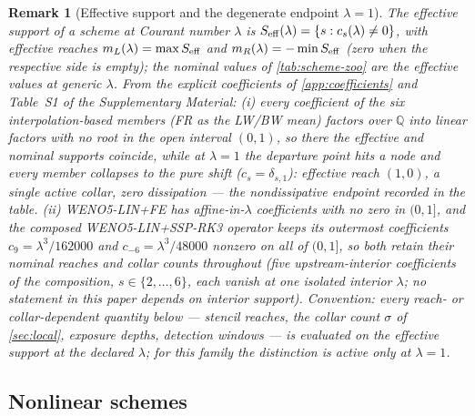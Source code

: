\documentclass[pdflatex,sn-mathphys-num]{sn-jnl}%
\theoremstyle{thmstyleone}%
\theoremstyle{thmstyletwo}%
\newtheorem{remark}{Remark}%
\theoremstyle{thmstylethree}%
\begin{document}
\begin{remark}[Effective support and the degenerate endpoint $\lambda=1$]\label{rem:effective-support}
The \emph{effective support} of a scheme at Courant number $\lambda$ is $S_{\rm eff}(\lambda)=\{s: c_s(\lambda)\ne0\}$, with effective reaches $m_L(\lambda)=\max S_{\rm eff}$ and $m_R(\lambda)=-\min S_{\rm eff}$ (zero when the respective side is empty); the nominal values of \cref{tab:scheme-zoo} are the effective values at generic $\lambda$.
From the explicit coefficients of \cref{app:coefficients} and Table~S1 of the Supplementary Material:
(i) every coefficient of the six interpolation-based members (FR as the LW/BW mean) factors over $\mathbb Q$ into linear factors with no root in the open interval $(0,1)$, so there the effective and nominal supports coincide, while at $\lambda=1$ the departure point hits a node and every member collapses to the pure shift ($c_s=\delta_{s,1}$): effective reach $(1,0)$, a single active collar, zero dissipation --- the nondissipative endpoint recorded in the table.
(ii) WENO5-LIN+FE has affine-in-$\lambda$ coefficients with no zero in $(0,1]$, and the composed WENO5-LIN+SSP-RK3 operator keeps its outermost coefficients $c_9=\lambda^{3}/162000$ and $c_{-6}=\lambda^{3}/48000$ nonzero on all of $(0,1]$, so both retain their nominal reaches and collar counts throughout (five upstream-interior coefficients of the composition, $s\in\{2,\dots,6\}$, each vanish at one isolated interior $\lambda$; no statement in this paper depends on interior support).
\emph{Convention:} every reach- or collar-dependent quantity below --- stencil reaches, the collar count $\sigma$ of \cref{sec:local}, exposure depths, detection windows --- is evaluated on the effective support at the declared $\lambda$; for this family the distinction is active only at $\lambda=1$.
\end{remark}

\subsection{Nonlinear schemes}\label{sec:nonlinear-family}
\end{document}
